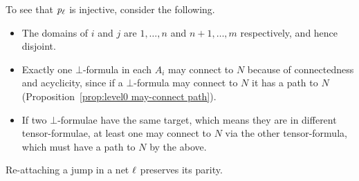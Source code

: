To see that $\mathit p_{\ell}$ is injective, consider the following.
\begin{itemize}
	\item The domains of $i$ and $j$ are $1,\dotsc,n$ and $n+1,\dotsc,m$ respectively, and hence disjoint.
	\item Exactly one $\bot$-formula in each $A_i$ may connect to $N$ because of connectedness and acyclicity, since if a $\bot$-formula may connect to $N$ it has a path to $N$ (Proposition~\ref{prop:level0 may-connect path}).
	\item If two $\bot$-formulae have the same target, which means they are in different tensor-formulae, at least one may connect to $N$ via the other tensor-formula, which must have a path to $N$ by the above.
\end{itemize}



\begin{proposition}
\label{lem:level0 min binary}
Re-attaching a jump in a net $\ell$ preserves its parity. 
\end{proposition}



